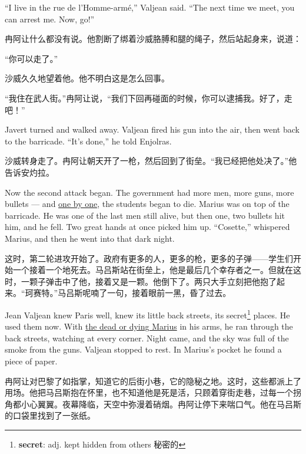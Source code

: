 \documentclass[fontset=ubuntu, zihao=5]{ctexart}
\begin{document}
\begin{paracol}{2}
``I live in the rue de l'Homme-armé,'' Valjean said. ``The next time we meet, you can arrest me. Now, go!''

\switchcolumn

冉阿让什么都没有说。他割断了绑着沙威胳膊和腿的绳子，然后站起身来，说道：

“你可以走了。”

沙威久久地望着他。他不明白这是怎么回事。

“我住在武人街。”冉阿让说，“我们下回再碰面的时候，你可以逮捕我。好了，走吧！”

\switchcolumn*

Javert turned and walked away. Valjean fired his gun into the air, then went back to the barricade. ``It's done,'' he told Enjolras.

\switchcolumn

沙威转身走了。冉阿让朝天开了一枪，然后回到了街垒。“我已经把他处决了。”他告诉安灼拉。

\switchcolumn*

Now the second attack began. The government had more men, more guns, more
bullets --- and \uline{one by one}, the students began to die. Marius was on top
of the barricade. He was one of the last men still alive, but then one, two
bullets hit him, and he fell. Two great hands at once picked him up.
``Cosette,'' whispered Marius, and then he went into that dark night.

\switchcolumn

这时，第二轮进攻开始了。政府有更多的人，更多的枪，更多的子弹——学生们开始一个接着一个地死去。马吕斯站在街垒上，他是最后几个幸存者之一。但就在这时，一颗子弹击中了他，接着又是一颗。他倒下了。两只大手立刻把他抱了起来。“珂赛特。”马吕斯呢喃了一句，接着眼前一黑，昏了过去。

\switchcolumn*

\sectionbreak

Jean Valjean knew Paris well, knew its little back streets, its
secret\footnote{\textbf{secret}: adj. kept hidden from others 秘密的} places. He
used them now. With \uline{the dead or dying Marius} in his arms, he ran through
the back streets, watching at every corner. Night came, and the sky was full of
the smoke from the guns. Valjean stopped to rest. In Marius's pocket he found a
piece of paper.

\switchcolumn

\sectionbreak

冉阿让对巴黎了如指掌，知道它的后街小巷，它的隐秘之地。这时，这些都派上了用场。他把马吕斯抱在怀里，也不知道他是死是活，只顾着穿街走巷，过每一个拐角都小心翼翼。夜幕降临，天空中弥漫着硝烟。冉阿让停下来喘口气。他在马吕斯的口袋里找到了一张纸。


\end{paracol}
\end{document}
